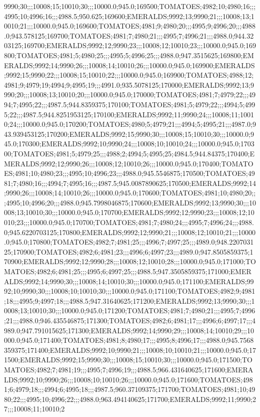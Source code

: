 9990;30;;;10008;15;10010;30;;;10000.0;945.0;169500;TOMATOES;4982;10;4980;16;;;4995;10;4996;16;;;4988.5;950.625;169600;EMERALDS;9992;13;9990;21;;;10008;13;10010;21;;;10000.0;945.0;169600;TOMATOES;4981;9;4980;20;;;4995;9;4996;20;;;4988.0;943.578125;169700;TOMATOES;4981;7;4980;21;;;4995;7;4996;21;;;4988.0;944.3203125;169700;EMERALDS;9992;12;9990;23;;;10008;12;10010;23;;;10000.0;945.0;169800;TOMATOES;4981;5;4980;25;;;4995;5;4996;25;;;4988.0;947.3515625;169800;EMERALDS;9992;14;9990;26;;;10008;14;10010;26;;;10000.0;945.0;169900;EMERALDS;9992;15;9990;22;;;10008;15;10010;22;;;10000.0;945.0;169900;TOMATOES;4988;12;4981;9;4979;19;4994;9;4995;19;;;4991.0;935.5078125;170000;EMERALDS;9992;13;9990;20;;;10008;13;10010;20;;;10000.0;945.0;170000;TOMATOES;4981;7;4979;22;;;4994;7;4995;22;;;4987.5;944.8359375;170100;TOMATOES;4981;5;4979;22;;;4994;5;4995;22;;;4987.5;944.8251953125;170100;EMERALDS;9992;11;9990;24;;;10008;11;10010;24;;;10000.0;945.0;170200;TOMATOES;4980;5;4979;21;;;4994;5;4995;21;;;4987.0;943.939453125;170200;EMERALDS;9992;15;9990;30;;;10008;15;10010;30;;;10000.0;945.0;170300;EMERALDS;9992;10;9990;24;;;10008;10;10010;24;;;10000.0;945.0;170300;TOMATOES;4981;5;4979;25;;;4988;2;4994;5;4995;25;4984.5;944.84375;170400;EMERALDS;9992;12;9990;26;;;10008;12;10010;26;;;10000.0;945.0;170400;TOMATOES;4981;10;4980;23;;;4995;10;4996;23;;;4988.0;945.5546875;170500;TOMATOES;4981;7;4980;16;;;4994;7;4995;16;;;4987.5;945.0087890625;170500;EMERALDS;9992;14;9990;26;;;10008;14;10010;26;;;10000.0;945.0;170600;TOMATOES;4981;10;4980;20;;;4995;10;4996;20;;;4988.0;945.7998046875;170600;EMERALDS;9992;13;9990;30;;;10008;13;10010;30;;;10000.0;945.0;170700;EMERALDS;9992;12;9990;23;;;10008;12;10010;23;;;10000.0;945.0;170700;TOMATOES;4981;7;4980;24;;;4995;7;4996;24;;;4988.0;945.6220703125;170800;EMERALDS;9992;12;9990;21;;;10008;12;10010;21;;;10000.0;945.0;170800;TOMATOES;4982;7;4981;25;;;4996;7;4997;25;;;4989.0;948.220703125;170900;TOMATOES;4982;6;4981;23;;;4996;6;4997;23;;;4989.0;947.8505859375;170900;EMERALDS;9992;12;9990;28;;;10008;12;10010;28;;;10000.0;945.0;171000;TOMATOES;4982;6;4981;25;;;4995;6;4997;25;;;4988.5;947.3505859375;171000;EMERALDS;9992;14;9990;30;;;10008;14;10010;30;;;10000.0;945.0;171100;EMERALDS;9992;10;9990;30;;;10008;10;10010;30;;;10000.0;945.0;171100;TOMATOES;4982;9;4981;18;;;4995;9;4997;18;;;4988.5;947.31640625;171200;EMERALDS;9992;13;9990;30;;;10008;13;10010;30;;;10000.0;945.0;171200;TOMATOES;4981;7;4980;21;;;4995;7;4996;21;;;4988.0;946.435546875;171300;TOMATOES;4982;6;4981;17;;;4996;6;4997;17;;;4989.0;947.791015625;171300;EMERALDS;9992;14;9990;29;;;10008;14;10010;29;;;10000.0;945.0;171400;TOMATOES;4981;8;4980;17;;;4995;8;4996;17;;;4988.0;945.7568359375;171400;EMERALDS;9992;10;9990;21;;;10008;10;10010;21;;;10000.0;945.0;171500;EMERALDS;9992;15;9990;30;;;10008;15;10010;30;;;10000.0;945.0;171500;TOMATOES;4982;7;4981;19;;;4995;7;4996;19;;;4988.5;966.431640625;171600;EMERALDS;9992;10;9990;26;;;10008;10;10010;26;;;10000.0;945.0;171600;TOMATOES;4981;6;4979;18;;;4994;6;4995;18;;;4987.5;960.37109375;171700;TOMATOES;4981;10;4980;22;;;4995;10;4996;22;;;4988.0;963.494140625;171700;EMERALDS;9992;11;9990;27;;;10008;11;10010;2